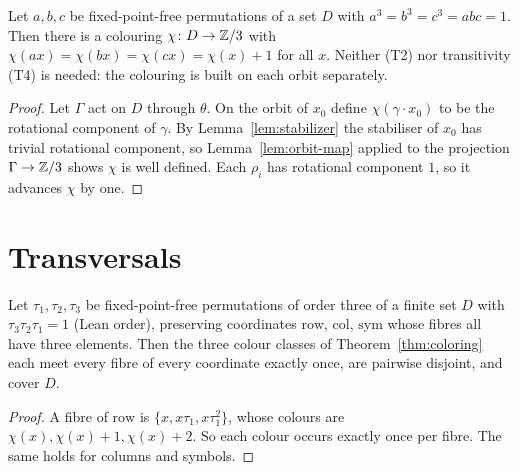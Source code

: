 \begin{theorem}\label{thm:coloring}
  \leanok
  Let $a, b, c$ be fixed-point-free permutations of a set $D$ with
  $a^3 = b^3 = c^3 = abc = 1$. Then there is a colouring
  $\chi \colon D \to \mathbb{Z}/3$ with
  $\chi(ax) = \chi(bx) = \chi(cx) = \chi(x) + 1$ for all $x$.
  Neither (T2) nor transitivity (T4) is needed: the colouring is built on
  each orbit separately.
\end{theorem}
\begin{proof}\leanok
  Let $\Gamma$ act on $D$ through $\theta$. On the orbit of $x_0$ define
  $\chi(\gamma \cdot x_0)$ to be the rotational component of $\gamma$.
  By Lemma~\ref{lem:stabilizer} the stabiliser of $x_0$ has trivial
  rotational component, so Lemma~\ref{lem:orbit-map} applied to the
  projection $\Gamma \to \mathbb{Z}/3$ shows $\chi$ is well defined. Each $\rho_i$
  has rotational component $1$, so it advances $\chi$ by one.
\end{proof}

\chapter{Transversals}

\begin{lemma}\label{lem:classes}
  \leanok
  Let $\tau_1, \tau_2, \tau_3$ be fixed-point-free permutations of order
  three of a finite set $D$ with $\tau_3\tau_2\tau_1 = 1$ (Lean order),
  preserving coordinates $\mathrm{row}$, $\mathrm{col}$, $\mathrm{sym}$
  whose fibres all have three elements. Then the three colour classes of
  Theorem~\ref{thm:coloring} each meet every fibre of every coordinate
  exactly once, are pairwise disjoint, and cover $D$.
\end{lemma}
\begin{proof}\leanok
  A fibre of $\mathrm{row}$ is $\{x, x\tau_1, x\tau_1^2\}$, whose colours
  are $\chi(x), \chi(x) + 1, \chi(x) + 2$. So each colour occurs exactly
  once per fibre. The same holds for columns and symbols.
\end{proof}

